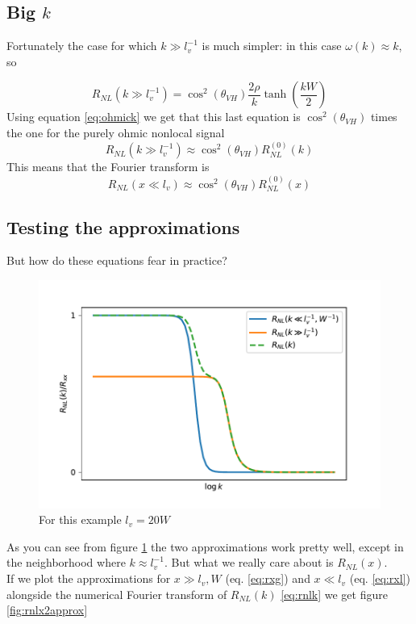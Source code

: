 \subsection{Big $k$}
Fortunately the case for which $k\gg l_v^{-1}$ is much simpler: in this case $\omega(k) \approx k$, so

\begin{equation}
    R_{NL}(k\gg l_v^{-1})=\cos^2(\theta_{VH})\frac {2\rho}{k}\tanh\left(\frac{kW}2\right)
\end{equation}
Using equation \ref{eq:ohmick} we get that this last equation is $\cos^2(\theta_{VH})$ times the one for the purely ohmic nonlocal signal
\begin{equation}
    R_{NL}(k\gg l_v^{-1})\approx
    \cos^2(\theta_{VH})R_{NL}^{(0)}(k)
\end{equation}
This means that the Fourier transform is
\begin{equation}
    R_{NL}(x\ll l_v)\approx\cos^2(\theta_{VH})R_{NL}^{(0)}(x)
    \label{eq:rxl}
\end{equation}
\subsection{Testing the approximations}
But how do these equations fear in practice?
\begin{figure}[h!]
    \centering
    \includegraphics[width=\linewidth]{Immagini/rnl/2approx.pdf}
    \caption{For this example $l_v=20W$}
    \label{fig:rnl2approx}
\end{figure}
As you can see from figure \ref{fig:rnl2approx} the two approximations work pretty well, except in the neighborhood where $k\approx l_v^{-1}$. But what we really care about is $R_{NL}(x)$.\\
If we plot the approximations for $x\gg l_v,W$ (eq. \ref{eq:rxg}) and $x\ll l_v$ (eq. \ref{eq:rxl}) alongside the numerical Fourier transform of $R_{NL}(k)$ \ref{eq:rnlk} we get figure \ref{fig:rnlx2approx}

